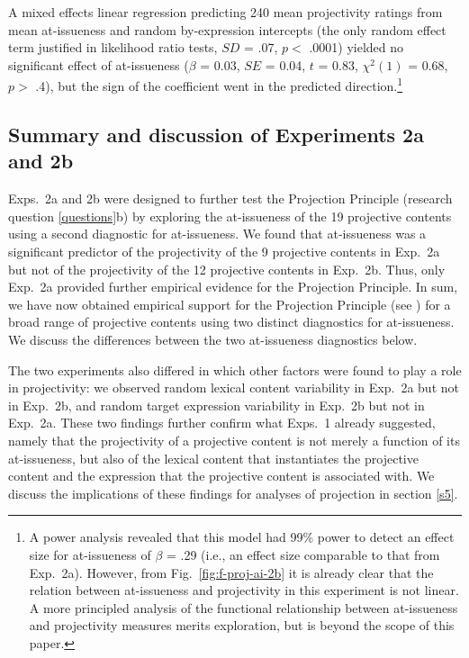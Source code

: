 \documentclass[11pt,fleqn]{article}
\newcommand{\6}{\mbox{$[\hspace*{-.6mm}[$}}
\newcommand{\9}{\mbox{$]\hspace*{-.6mm}]$}}
\newcommand{\figref}[1]{Fig.~\ref{#1}}
\begin{document}
A mixed effects linear regression predicting 240 mean projectivity ratings from mean at-issueness and random by-expression intercepts (the only random effect term justified in likelihood ratio tests, $SD$ = .07, $p <$ .0001) yielded no significant effect of at-issueness ($\beta$ = 0.03, $SE$ = 0.04, $t$ = 0.83, $\chi^2(1)$ = 0.68, $p >$ .4), but the sign of the coefficient went in the predicted direction.\footnote{A power analysis revealed that this model had 99\% power to detect an effect size for at-issueness of $\beta$ = .29 (i.e., an effect size comparable to that from Exp.~2a).  However, from \figref{fig:f-proj-ai-2b} it is already clear that the relation between at-issueness and projectivity in this experiment is not linear. A more principled analysis of the functional relationship between at-issueness and projectivity measures merits exploration, but is beyond the scope of this paper.   %
}



\subsection{Summary and discussion of Experiments 2a and 2b}\label{s-disc2}

Exps.~2a and 2b were designed to further test the Projection Principle (research question \ref{questions}b) by exploring the at-issueness of the 19 projective contents using a second diagnostic for at-issueness. We found that at-issueness was a significant predictor of the projectivity of the 9 projective contents in Exp.~2a but not of the projectivity of the 12 projective contents in Exp.~2b. Thus, only Exp.~2a provided further empirical evidence for the Projection Principle. In sum, we have now obtained empirical support for the Projection Principle (see \citealt{brst-salt10,brst-ar}) for a broad range of projective contents using two distinct diagnostics for at-issueness. We discuss the differences between the two at-issueness diagnostics below.

The two experiments also differed in which other factors were found to play a role in projectivity: we observed random lexical content variability in Exp.~2a but not in Exp.~2b, and random target expression variability in Exp.~2b but not in Exp.~2a. These two findings further confirm what Exps.~1 already suggested, namely that the projectivity of a projective content is not merely a function of its at-issueness, but also of the lexical content that instantiates the projective content and the expression that the projective content is associated with. We discuss the implications of these findings for analyses of projection in section \ref{s5}.
\end{document}
